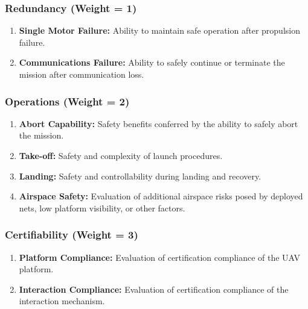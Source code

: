 \subsubsection*{Redundancy (Weight = 1)}
\begin{enumerate}
    \item \textbf{Single Motor Failure:} Ability to maintain safe operation after propulsion failure.
    \item \textbf{Communications Failure:} Ability to safely continue or terminate the mission after communication loss.
\end{enumerate}

\subsubsection*{Operations (Weight = 2)}
\begin{enumerate}
    \item \textbf{Abort Capability:} Safety benefits conferred by the ability to safely abort the mission.
    \item \textbf{Take-off:} Safety and complexity of launch procedures.
    \item \textbf{Landing:} Safety and controllability during landing and recovery.
    \item \textbf{Airspace Safety:} Evaluation of additional airspace risks posed by deployed nets, low platform visibility, or other factors.
\end{enumerate}

\subsubsection*{Certifiability (Weight = 3)}
\begin{enumerate}
    \item \textbf{Platform Compliance:} Evaluation of certification compliance of the UAV platform.
    \item \textbf{Interaction Compliance:} Evaluation of certification compliance of the interaction mechanism.
\end{enumerate}



